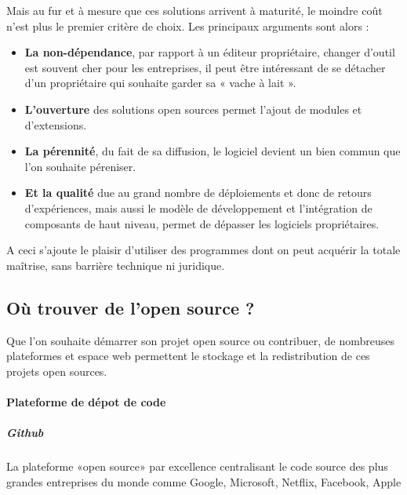 				Mais au fur et à mesure que ces solutions arrivent à maturité, le moindre coût n'est plus le premier critère de choix.
				Les principaux arguments sont alors :

				\begin{itemize}[label=\textbullet, font=\LARGE \color{burntorange}]
					\item \textbf{La non-dépendance}, par rapport à un éditeur propriétaire, changer d'outil est souvent cher pour les entreprises, il peut être intéressant de se détacher d'un propriétaire qui souhaite garder sa « vache à lait ».
					\item \textbf{L'ouverture} des solutions open sources permet l'ajout de modules et d'extensions.
					\item \textbf{La pérennité}, du fait de sa diffusion, le logiciel devient un bien commun que l'on souhaite péreniser. 
					\item \textbf{Et la qualité} due au grand nombre de déploiements et donc de retours d'expériences, mais aussi le modèle de développement et l'intégration de composants de haut niveau, permet de dépasser les logiciels propriétaires.
				\end{itemize}

				A ceci s'ajoute le plaisir d'utiliser des programmes dont on peut acquérir la totale maîtrise, sans barrière technique ni juridique.

		\subsection{Où trouver de l'open source ?} 

			Que l'on souhaite démarrer son projet open source ou contribuer, de nombreuses plateformes et espace web permettent le stockage et la redistribution de ces projets open sources.

			\paragraph{Plateforme de dépot de code}

				\subparagraph{Github\\}
				La plateforme «open source» par excellence centralisant le code source des plus grandes entreprises du monde comme Google, Microsoft, Netflix, Facebook, Apple

